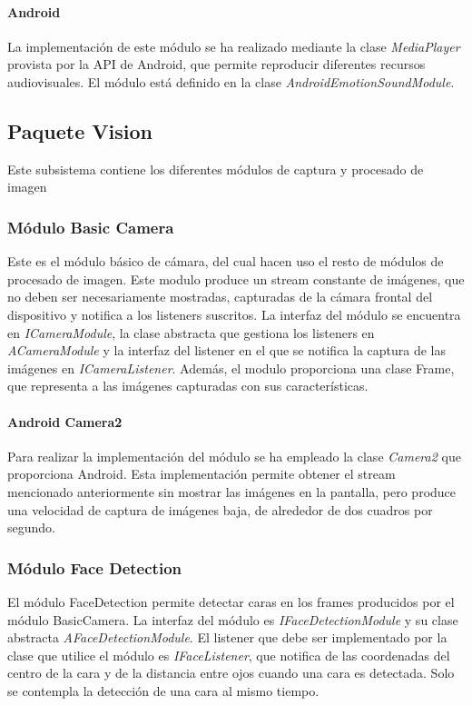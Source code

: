 \paragraph*{Android\\}

La implementación de este módulo se ha realizado mediante la clase \textit{MediaPlayer} provista por la API de Android, que permite reproducir diferentes recursos audiovisuales. El módulo está definido en la clase \textit{AndroidEmotionSoundModule}.



\newpage
\subsection{Paquete Vision}
Este subsistema contiene los diferentes módulos de captura y procesado de imagen
\subsubsection{Módulo Basic Camera}
Este es el módulo básico de cámara, del cual hacen uso el resto de módulos de procesado de imagen. Este modulo produce un stream constante de imágenes, que no deben ser necesariamente mostradas, capturadas de la cámara frontal del dispositivo y notifica a los listeners suscritos.
La interfaz del módulo se encuentra en \textit{ICameraModule}, la clase abstracta que gestiona los listeners en \textit{ACameraModule} y la interfaz del listener en el que se notifica la captura de las imágenes en \textit{ICameraListener}. Además, el modulo proporciona una clase Frame, que representa a las imágenes capturadas con sus características.

\paragraph*{Android Camera2\\}
Para realizar la implementación del módulo se ha empleado la clase \textit{Camera2} que proporciona Android. Esta implementación permite obtener el stream mencionado anteriormente sin mostrar las imágenes en la pantalla, pero produce una velocidad de captura de imágenes baja, de alrededor de dos cuadros por segundo.
\subsubsection{Módulo Face Detection}
El módulo FaceDetection permite detectar caras en los frames producidos por el módulo BasicCamera. La interfaz del módulo es \textit{IFaceDetectionModule} y su clase abstracta \textit{AFaceDetectionModule}. El listener que debe ser implementado por la clase que utilice el módulo es \textit{IFaceListener}, que notifica de las coordenadas del centro de la cara y de la distancia entre ojos cuando una cara es detectada. Solo se contempla la detección de una cara al mismo tiempo.


